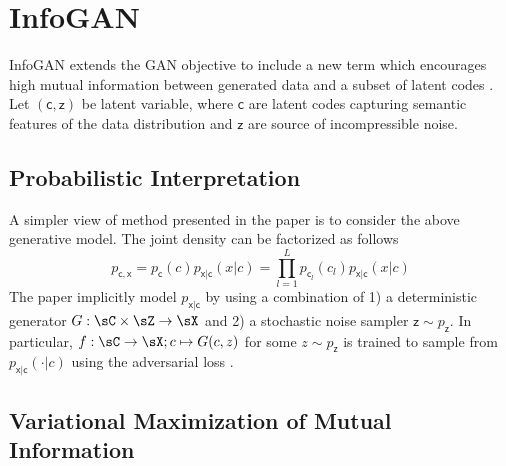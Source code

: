 \documentclass[11pt]{article}
\newcommand\rx{\ensuremath{\mathsf{x}}}
\newcommand\rc{\ensuremath{\mathsf{c}}}
\newcommand\rz{\ensuremath{\mathsf{z}}}
\begin{document}
 


\section{InfoGAN}

InfoGAN extends the GAN objective to include a new term which encourages high mutual information between generated data and a subset of latent codes \cite{chenInfoGANInterpretableRepresentation2016}. Let $(\rc,\rz)$ be latent variable, where $\rc$ are latent codes capturing semantic features of the data distribution and $\rz$ are source of incompressible noise.

\subsection{Probabilistic Interpretation}

A simpler view of method presented in the paper is to consider the above generative model. The joint density can be factorized as follows
\[
    p_{\rc,\rx} = p_{\rc}(c) p_{\rx|\rc}(x|c) = \prod_{l=1}^L p_{\rc_l}(c_l) p_{\rx|\rc}(x|c)
\]
The paper implicitly model $p_{\rx|\rc}$ by using a combination of 1) a deterministic generator $G:\sC\times\sZ\to\sX$ and 2) a stochastic noise sampler $\rz \sim p_{\rz}$. In particular, $f:\sC\to \sX; c \mapsto G(c,z)$ for some $z\sim p_{\rz}$ is trained to sample from $p_{\rx|\rc}(\cdot|c)$ using the adversarial loss \cite{goodfellowGenerativeAdversarialNetworks2014}.

\subsection{Variational Maximization of Mutual Information}
\end{document}

